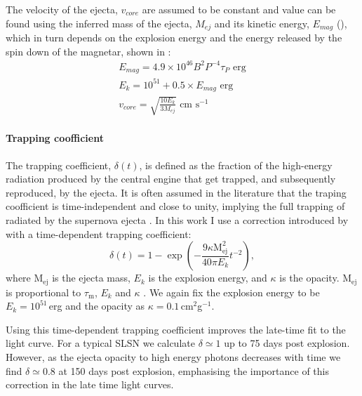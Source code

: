 The velocity of the ejecta, $v_{core}$ are assumed to be constant and value can be found using the inferred mass of the ejecta, $M_{ej}$ and its kinetic energy, $E_{mag}$ (), which in turn depends on the explosion energy and the energy released by the spin down of the magnetar, shown in :
\begin{align}
\label{Eq:Emag}
E_{mag} = 4.9\times10^{46} B^2 P^{-4} \tau_{P}  \text{ erg} \\
E_k = 10^{51} + 0.5 \times E_{mag} \text{ erg}\\
\label{Eq:vcore}
v_{core} =  \sqrt{\frac{10 E_{k}}{3 M_{ej}}} \text{ cm s}^{-1}
\end{align}

\paragraph{Trapping coofficient}
The trapping coefficient, $\delta(t)$, is defined as the fraction of the high-energy radiation produced by the central engine that get trapped, and subsequently reproduced, by the ejecta. It is often assumed in the literature that the traping coofficient is time-independent and close to unity, implying the full trapping of radiated by the supernova ejecta \citep{2013ApJ...770..128I,2015MNRAS.449.1215P,2015MNRAS.452.3869N}. In this work I use a correction introduced by \cite{2015ApJ...799..107W} with a time-dependent trapping coefficient:
\begin{equation}
\delta(t) = 1 - \exp\left({-\frac{9\kappa \mathrm{M}_{\mathrm{ej}}^{2}}{40\pi  E_k} t^{-2}} \right),
\label{Eq:Wang}
\end{equation}
\noindent where $\mathrm{M}_{\mathrm{ej}}$ is the ejecta mass, $E_k$ is the explosion energy, and $\kappa$ is the opacity. $\mathrm{M}_{\mathrm{ej}}$ is proportional to $\tau_\mathrm{m}$, $E_k$ and $\kappa$ \citep{2013ApJ...770..128I}. We again fix the explosion energy to be $E_k = 10^{51}$\,erg and the opacity as $\kappa =0.1$\,cm$^2$g$^{-1}$.

Using this time-dependent trapping coefficient improves the late-time fit to the light curve. For a typical SLSN we calculate $\delta \simeq 1$ up to 75 days post explosion. However, as the ejecta opacity to high energy photons decreases with time we find $\delta \simeq 0.8$ at 150 days post explosion, emphasising the importance of this correction in the late time light curves.


